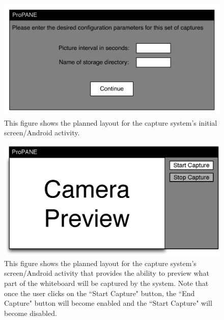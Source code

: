 \documentclass[]{article}
\begin{document}
					\begin{figure}
						\centering
						\includegraphics{images/app-main-layout-eps-converted-to.pdf}
						\caption{This figure shows the planned layout for the capture system's initial screen/Android activity.}
						\label{img:app-main-layout}
					\end{figure}
					
					\begin{figure}
						\centering
						\includegraphics{images/app-preview-layout.eps}
						\caption{This figure shows the planned layout for the capture system's screen/Android activity that provides the ability to preview what part of the whiteboard will be captured by the system. Note that once the user clicks on the ``Start Capture" button, the ``End Capture" button will become enabled and the ``Start Capture" will become disabled.}
						\label{img:app-preview-layout}
					\end{figure}
					
\end{document}
